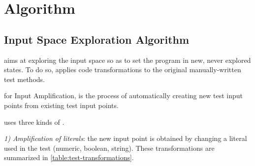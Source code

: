 \section{Algorithm}
\label{sec:dspot:algorithm}
\subsection{Input Space Exploration Algorithm}
\label{subsec:dspot:algorithm:input-space-exploration}

\dspot aims at exploring the input space so as to set the program in new, never explored states. To do so, \dspot applies code transformations to the original manually-written test methods. 

\textbf{\Iampl} for Input Amplification, is the process of automatically creating new test input points from existing test input points.

\dspot uses three kinds of \Iampl.

\emph{1) Amplification of literals}: the new input point is obtained by changing a literal used in the test (numeric, boolean, string).
These transformations are summarized in \autoref{table:test-transformations}.

